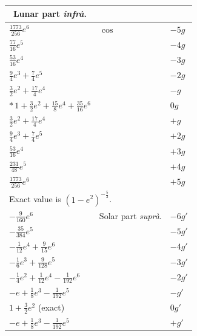 \documentclass[11pt]{article}
\begin{document}
\begin{center}
\begin{tabular}{|l|l|l|}
\hline
\multicolumn{1}{|c|}{Lunar part \textit{infr\`a}.} & & \\
\hline
$\tfrac{1773}{256}e^{6}$                           & $\cos$ & $-5g$ \\
$\tfrac{77}{16}e^{5}$                              &        & $-4g$ \\
$\tfrac{53}{16}e^{4}$                              &        & $-3g$ \\
$\tfrac{9}{4}e^{3}+\tfrac{7}{4}e^{5}$              &        & $-2g$ \\
$\tfrac{3}{2}e^{2}+\tfrac{17}{4}e^{4}$             &        & $-g$ \\
$*\,1+\tfrac{3}{2}e^{2}+\tfrac{15}{8}e^{4}+\tfrac{35}{16}e^{6}$ &  & $0g$ \\
$\tfrac{3}{2}e^{2}+\tfrac{17}{4}e^{4}$             &        & $+g$ \\
$\tfrac{9}{4}e^{3}+\tfrac{7}{4}e^{5}$              &        & $+2g$ \\
$\tfrac{53}{16}e^{4}$                              &        & $+3g$ \\
$\tfrac{231}{48}e^{5}$                             &        & $+4g$ \\
$\tfrac{1773}{256}e^{6}$                           &        & $+5g$ \\
\hline
\multicolumn{3}{|l|}{\small * Exact value is $(1-e^{2})^{-\tfrac{5}{2}}$.} \\
\hline
$-\tfrac{9}{160}e^{6}$                                 & Solar part \textit{supr\`a}.  & $-6g'$ \\
$-\tfrac{35}{384}e^{5}$                                &                               & $-5g'$ \\
$-\tfrac{1}{12}e^{4}+\tfrac{9}{15}e^{6}$               &                               & $-4g'$ \\
$-\tfrac{1}{6}e^{3}+\tfrac{9}{128}e^{5}$               &                               & $-3g'$ \\
$-\tfrac{1}{4}e^{2}+\tfrac{1}{12}e^{4}-\tfrac{1}{192}e^{6}$ &                          & $-2g'$ \\
$-e+\tfrac{1}{8}e^{3}-\tfrac{1}{192}e^{5}$             &                               & $-g'$ \\
$1+\tfrac{3}{2}e^{2}$ (exact)                          &                               & $0g'$ \\
$-e+\tfrac{1}{8}e^{3}-\tfrac{1}{192}e^{5}$             &                               & $+g'$ \\

\end{tabular}
\end{center}
\end{document}

